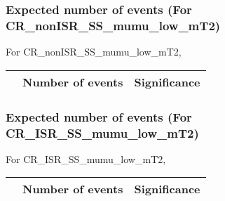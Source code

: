 \begin{frame}
\frametitle{Expected number of events (For CR\_nonISR\_SS\_mumu\_low\_mT2)}
For CR\_nonISR\_SS\_mumu\_low\_mT2,\\
\vspace{5mm}
\begin{tabular}{|c|c|c|}
\hline
& Number of events & Significance \\
\hline

\end{tabular}
\end{frame}

\begin{frame}
\frametitle{Expected number of events (For CR\_ISR\_SS\_mumu\_low\_mT2)}
For CR\_ISR\_SS\_mumu\_low\_mT2,\\
\vspace{5mm}
\begin{tabular}{|c|c|c|}
\hline
& Number of events & Significance \\
\hline

\end{tabular}
\end{frame}

